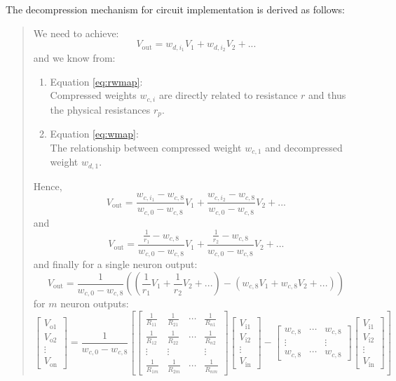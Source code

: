 The decompression mechanism for circuit implementation is derived as follows:
\begin{quote}
	We need to achieve:
	$$V_{\text{out}}=w_{d,i_1}V_1+w_{d,i_2}V_2+...$$
	and we know from:
	\begin{enumerate}
		\item Equation \ref{eq:rwmap}:\\ Compressed weights $w_{c,i}$ are directly related to resistance $r$ and thus the physical resistances $r_p$.
		\item Equation \ref{eq:wmap}:\\
		The relationship between compressed weight $w_{c,1}$ and decompressed weight $w_{d,1}$.
	\end{enumerate}
	Hence,
	$$V_{\text{out}}=\frac{w_{c,i_1}-w_{c,8}}{w_{c,0}-w_{c,8}}V_1+\frac{w_{c,i_2}-w_{c,8}}{w_{c,0}-w_{c,8}}V_2+...$$
	and
	$$V_{\text{out}}=\frac{\frac{1}{r_1}-w_{c,8}}{w_{c,0}-w_{c,8}}V_1+\frac{\frac{1}{r_2}-w_{c,8}}{w_{c,0}-w_{c,8}}V_2+...$$
	and finally for a single neuron output:
	\begin{equation}
	\label{eq:final34compdecomp}
	V_{\text{out}}=\frac{1}{w_{c,0}-w_{c,8}}\left( \left(\frac{1}{r_1}V_1+\frac{1}{r_2}V_2+... \right)-\left(w_{c,8}V_1+w_{c,8}V_2+... \right)\right)
	\end{equation}
	for $m$ neuron outputs:
	\begin{equation}
	\label{eq:finalncompdecomp}
	\begin{bmatrix}
	V_{\text{o1}} \\
	V_{\text{o2}} \\
	\vdots \\
	V_{\text{on}}
	\end{bmatrix}=\frac{1}{w_{c,0}-w_{c,8}}
	\left[ 
	\begin{bmatrix}
	\frac{1}{R_{11}} & \frac{1}{R_{21}} & \cdots & \frac{1}{R_{n1}} \\
	\frac{1}{R_{12}} & \frac{1}{R_{22}} & \cdots & \frac{1}{R_{n2}} \\
	\vdots & \vdots & & \vdots \\
	\frac{1}{R_{1m}} & \frac{1}{R_{2m}} & \cdots & \frac{1}{R_{nm}}
	\end{bmatrix}
	\begin{bmatrix}
	V_{\text{i1}} \\
	V_{\text{i2}} \\
	\vdots \\
	V_{\text{in}}
	\end{bmatrix}
	-\begin{bmatrix}
	w_{c,8} &  \cdots & w_{c,8} \\
	\vdots &  & \vdots \\
	w_{c,8} & \cdots & w_{c,8}
	\end{bmatrix}
	\begin{bmatrix}
	V_{\text{i1}} \\
	V_{\text{i2}} \\
	\vdots \\
	V_{\text{in}}
	\end{bmatrix}
	\right] 
	\end{equation}
\end{quote}
